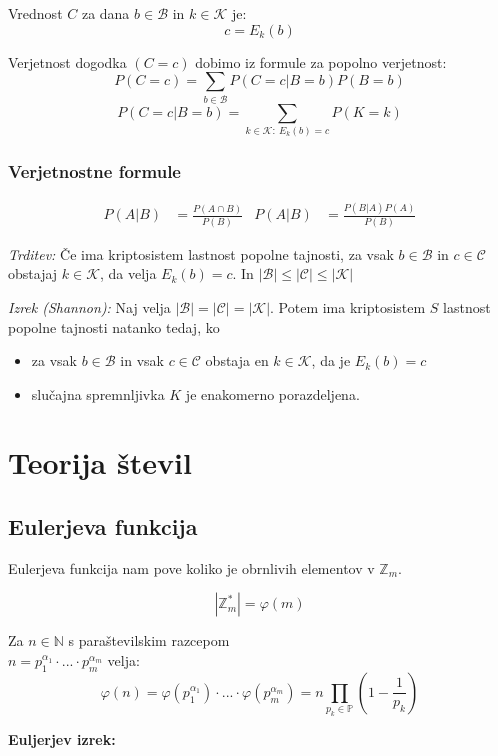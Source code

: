 \begin{multicols}{5}
Vrednost $C$ za dana $b \in \mathcal{B}$ in $k \in \mathcal{K}$ je:
\[ c = E_k(b) \]

Verjetnost dogodka $(C = c)$ dobimo iz formule za popolno verjetnost:
\[ P(C = c) = \sum_{b \in \mathcal{B}} P(C = c | B = b) P(B = b) \]
\[ P(C = c | B = b) = \sum_{k \in \mathcal{K}:\ E_k(b) = c} P(K = k) \]

\subsubsection*{Verjetnostne formule}
\begin{align*}
	P(A|B) &= \frac{P(A \cap B)}{P(B)} & P(A|B) &= \frac{P(B|A)P(A)}{P(B)} 
\end{align*}

\textit{Trditev:} Če ima kriptosistem lastnost popolne tajnosti, za 
vsak $b \in \mathcal{B}$ in $c \in \mathcal{C}$ obstajaj $k \in \mathcal{K}$, 
da velja $E_k(b) = c$. In $|\mathcal{B}| \leq |\mathcal{C}| \leq |\mathcal{K}|$


\textit{Izrek (Shannon):} Naj velja $|\mathcal{B}| = |\mathcal{C}| = |\mathcal{K}|$.
Potem ima kriptosistem $S$ lastnost popolne tajnosti natanko tedaj, ko
\begin{itemize}
	\item za vsak $b \in \mathcal{B}$ in vsak $c \in \mathcal{C}$ obstaja en $k \in \mathcal{K}$,
	da je $E_k(b) = c$
	\item slučajna spremnljivka $K$ je enakomerno porazdeljena.
\end{itemize}

\section*{Teorija števil}

\subsection{Eulerjeva funkcija}
Eulerjeva funkcija nam pove koliko je obrnlivih elementov v $\mathbb{Z}_m$.

\[ | \mathbb{Z}_m^* | = \varphi(m) \]

Za $n \in \mathbb{N}$ s paraštevilskim razcepom \\ $ n = p_1^{\alpha_1} \cdot ... \cdot p_m^{\alpha_m}$ velja:
\[\varphi(n) = \varphi(p_1^{\alpha_1}) \cdot ... \cdot \varphi(p_m^{\alpha_m}) = n \prod_{ p_k \in \mathbb{P}} \left(1-\frac{1}{p_k} \right) \]

\textbf{Euljerjev izrek:}


\end{multicols}
